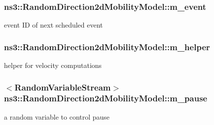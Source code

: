 \subsubsection[{\texorpdfstring{m\+\_\+event}{m_event}}]{ ns3\+::\+Random\+Direction2d\+Mobility\+Model\+::m\+\_\+event\hspace{0.3cm}{\ttfamily [private]}}\hypertarget{classns3_1_1RandomDirection2dMobilityModel_a2e7d05b42d0feecc56498746890a5f1f}{}\label{classns3_1_1RandomDirection2dMobilityModel_a2e7d05b42d0feecc56498746890a5f1f}


event ID of next scheduled event 

\subsubsection[{\texorpdfstring{m\+\_\+helper}{m_helper}}]{ ns3\+::\+Random\+Direction2d\+Mobility\+Model\+::m\+\_\+helper\hspace{0.3cm}{\ttfamily [private]}}\hypertarget{classns3_1_1RandomDirection2dMobilityModel_a450807b9fff43fc06d24d0c3d1b976d4}{}\label{classns3_1_1RandomDirection2dMobilityModel_a450807b9fff43fc06d24d0c3d1b976d4}


helper for velocity computations 

\subsubsection[{\texorpdfstring{m\+\_\+pause}{m_pause}}]{$<${\bf Random\+Variable\+Stream}$>$ ns3\+::\+Random\+Direction2d\+Mobility\+Model\+::m\+\_\+pause\hspace{0.3cm}{\ttfamily [private]}}\hypertarget{classns3_1_1RandomDirection2dMobilityModel_aef102cfa4b6e22a2292b1f82ac16bf76}{}\label{classns3_1_1RandomDirection2dMobilityModel_aef102cfa4b6e22a2292b1f82ac16bf76}


a random variable to control pause 

